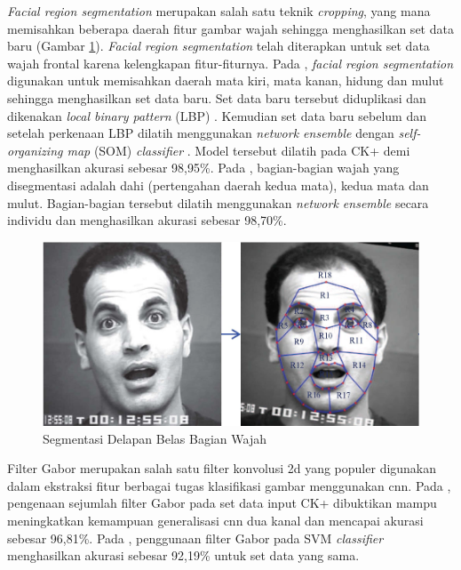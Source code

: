 \textit{Facial region segmentation} merupakan salah satu teknik \textit{cropping}, yang mana memisahkan beberapa daerah fitur gambar wajah sehingga menghasilkan set data baru (Gambar \ref{fig:segmentasi18}). \textit{Facial region segmentation} telah diterapkan untuk set data wajah frontal karena kelengkapan fitur-fiturnya. Pada , \textit{facial region segmentation} digunakan untuk memisahkan daerah mata kiri, mata kanan, hidung dan mulut sehingga menghasilkan set data baru. Set data baru tersebut diduplikasi dan dikenakan \textit{local binary pattern} (LBP) . Kemudian set data baru sebelum dan setelah perkenaan LBP dilatih menggunakan \textit{network ensemble} dengan \textit{self-organizing map} (SOM) \textit{classifier} . Model tersebut dilatih pada CK+ demi menghasilkan akurasi sebesar 98,95\%. Pada , bagian-bagian wajah yang disegmentasi adalah dahi (pertengahan daerah kedua mata), kedua mata dan mulut. Bagian-bagian tersebut dilatih menggunakan \textit{network ensemble} secara individu dan menghasilkan akurasi sebesar 98,70\%.
\begin{figure}[t]
    \centering
    \includegraphics[width=14cm]{gambar/segmentasi_wajah_18.png}
    \caption[Segmentasi Delapan Belas Bagian Wajah]{Segmentasi Delapan Belas Bagian Wajah \protect{}}
    \label{fig:segmentasi18}
\end{figure}

Filter Gabor merupakan salah satu filter konvolusi \acrshort{2d} yang populer digunakan dalam ekstraksi fitur berbagai tugas klasifikasi gambar menggunakan \acrshort{cnn}. Pada , pengenaan sejumlah filter Gabor pada set data input CK+ dibuktikan mampu meningkatkan kemampuan generalisasi \acrshort{cnn} dua kanal dan mencapai akurasi sebesar 96,81\%. Pada , penggunaan filter Gabor pada SVM \textit{classifier} menghasilkan akurasi sebesar 92,19\% untuk set data yang sama.

